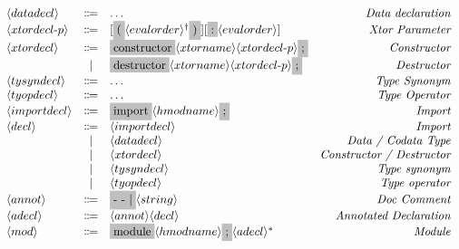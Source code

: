 \documentclass[11pt]{article}
\newcommand{\nonterminal}[1]{\langle #1 \rangle}
\newcommand{\terminal}[1]{\colorbox{lightgray}{\vphantom{X}#1}}
\newcommand{\commalist}[1]{#1^{\dagger}}
\begin{document}
\[
  \begin{array}{lclr}
    \nonterminal{datadecl} & \Coloneqq & \ldots & \emph{Data declaration} \\
    \nonterminal{xtordecl$-$p} & \Coloneqq & [\terminal{(} \commalist{\nonterminal{evalorder}} \terminal{)}] [\terminal{:} \nonterminal{evalorder}] & \emph{Xtor Parameter} \\
    \nonterminal{xtordecl} & \Coloneqq & \terminal{constructor} \nonterminal{xtorname} \nonterminal{xtordecl$-$p}\terminal{;} & \emph{Constructor} \\
    & | & \terminal{destructor} \nonterminal{xtorname}\nonterminal{xtordecl$-$p} \terminal{;} & \emph{Destructor} \\
    \nonterminal{tysyndecl} & \Coloneqq & \ldots & \emph{Type Synonym} \\
    \nonterminal{tyopdecl} & \Coloneqq & \ldots & \emph{Type Operator} \\
    \nonterminal{importdecl} & \Coloneqq & \terminal{import} \nonterminal{hmodname}\terminal{;} & \emph{Import} \\
    \nonterminal{decl} & \Coloneqq & \nonterminal{importdecl}  & \emph{Import} \\
    & | & \nonterminal{datadecl} & \emph{Data / Codata Type} \\
    & | & \nonterminal{xtordecl} & \emph{Constructor / Destructor} \\
    & | & \nonterminal{tysyndecl} & \emph{Type synonym} \\
    & | & \nonterminal{tyopdecl} & \emph{Type operator} \\
    \nonterminal{annot} & \Coloneqq & \terminal{- - $|$} \nonterminal{string} & \emph{Doc Comment} \\
    \nonterminal{adecl} & \Coloneqq & \nonterminal{annot}\nonterminal{decl} & \emph{Annotated Declaration} \\
    \nonterminal{mod} & \Coloneqq & \terminal{module} \nonterminal{hmodname} \terminal{;} \nonterminal{adecl}^{\ast}& \emph{Module}
  \end{array}
\]
\end{document}
